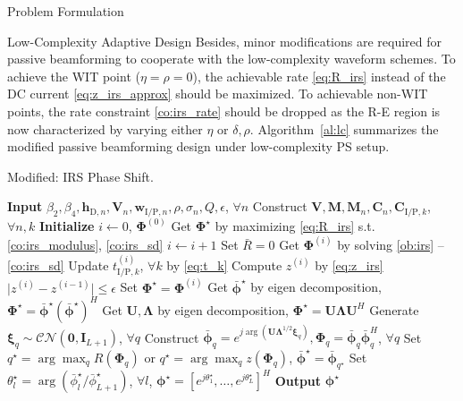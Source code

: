 \documentclass[journal]{IEEEtran}
\begin{document}
\begin{section}{Problem Formulation}
\begin{subsection}{Low-Complexity Adaptive Design}
			Besides, minor modifications are required for passive beamforming to cooperate with the low-complexity waveform schemes. To achieve the WIT point ($\eta=\rho=0$), the achievable rate \eqref{eq:R_irs} instead of the DC current \eqref{eq:z_irs_approx} should be maximized. To achievable non-WIT points, the rate constraint \eqref{co:irs_rate} should be dropped as the R-E region is now characterized by varying either $\eta$ or $\delta,\rho$. Algorithm~\ref{al:lc} summarizes the modified passive beamforming design under low-complexity PS setup.

			\begin{algorithm}[!t]
				\caption{Modified: IRS Phase Shift.}
				\label{al:lc}
				\begin{algorithmic}[1]
					\State \textbf{Input} $\beta_2,\beta_4,\boldsymbol{h}_{\mathrm{D},n},\boldsymbol{V}_{n},\boldsymbol{w}_{\mathrm{I/P},n},\rho,\sigma_n,Q,\epsilon$, $\forall n$
					\State Construct $\boldsymbol{V},\boldsymbol{M},\boldsymbol{M}_n,\boldsymbol{C}_{n},\boldsymbol{C}_{\mathrm{I/P},k}$, $\forall n,k$
					\State \textbf{Initialize} $i \gets 0$, $\boldsymbol{\Phi}^{(0)}$
						\State Get $\boldsymbol{\Phi}^{\star}$ by maximizing \eqref{eq:R_irs} s.t. \eqref{co:irs_modulus}, \eqref{co:irs_sd}
					\Else
						\Repeat
							\State $i \gets i + 1$
								\State Set $\bar{R}=0$
								\State Get $\boldsymbol{\Phi}^{(i)}$ by solving \ref{ob:irs} -- \ref{co:irs_sd}
								\State Update $t_{\mathrm{I/P},k}^{(i)}$, $\forall k$ by \eqref{eq:t_k}
								\State Compute $z^{(i)}$ by \eqref{eq:z_irs}
						\Until $\lvert z^{(i)}-z^{(i-1)} \rvert \le \epsilon$
						\State Set $\boldsymbol{\Phi}^{\star}=\boldsymbol{\Phi}^{(i)}$
					\EndIf
						\State Get $\bar{\boldsymbol{\phi}}^\star$ by eigen decomposition, $\boldsymbol{\Phi}^{\star}=\bar{\boldsymbol{\phi}}^\star(\bar{\boldsymbol{\phi}}^\star)^H$
					\Else
						\State Get $\boldsymbol{U},\boldsymbol{\Lambda}$ by eigen decomposition, $\boldsymbol{\Phi}^{\star}=\boldsymbol{U}\boldsymbol{\Lambda}\boldsymbol{U}^H$
						\State Generate $\boldsymbol{\xi}_q \sim \mathcal{CN}(\boldsymbol{0},\boldsymbol{I}_{L+1})$, $\forall q$
						\State Construct $\bar{\boldsymbol{\phi}}_q=e^{j\arg\left(\boldsymbol{U}\boldsymbol{\Lambda}^{1/2}\boldsymbol{\xi}_q\right)},\boldsymbol{\Phi}_q=\bar{\boldsymbol{\phi}}_q\bar{\boldsymbol{\phi}}_q^H$, $\forall q$
						\State Set $q^{\star}=\arg\max_q{R(\boldsymbol{\Phi}_q)}$ or $q^{\star}=\arg\max_q{z(\boldsymbol{\Phi}_q)}$, $\bar{\boldsymbol{\phi}}^\star=\bar{\boldsymbol{\phi}}_{q^{\star}}$
					\EndIf
					\State Set $\theta_l^\star=\arg(\bar{\phi}_l^\star/\bar{\phi}_{L+1}^\star)$, $\forall l$, $\boldsymbol{\phi}^{\star}=[e^{j\theta_1^\star},\dots,e^{j\theta_L^\star}]^H$
					\State \textbf{Output} $\boldsymbol{\phi}^{\star}$
				\end{algorithmic}
			\end{algorithm}


\end{subsection}
\end{section}
\end{document}
